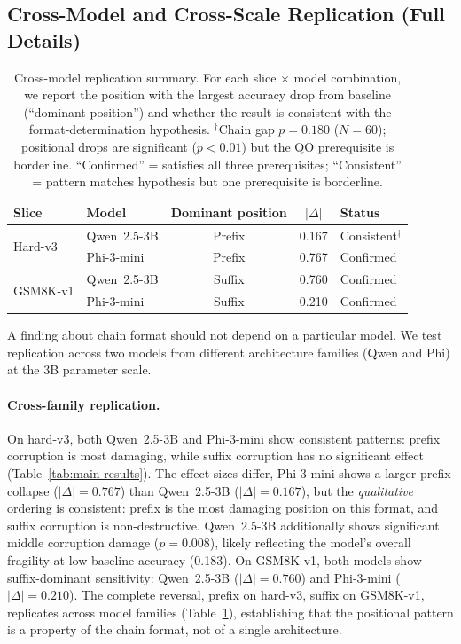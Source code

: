 \documentclass{article}
\theoremstyle{definition}
\theoremstyle{definition}
\begin{document}
\subsection{Cross-Model and Cross-Scale Replication (Full Details)}
\label{sec:crossmodel}

\begin{table}[t]
  \centering
  \small
  \caption{Cross-model replication summary. For each slice $\times$ model
  combination, we report the position with the largest accuracy drop
  from baseline (``dominant position'') and whether the result is
  consistent with the format-determination hypothesis.
  $^\dagger$Chain gap $p=0.180$ ($N=60$); positional drops are
  significant ($p{<}0.01$) but the QO prerequisite is borderline.
  ``Confirmed'' = satisfies all three prerequisites; ``Consistent'' = pattern
  matches hypothesis but one prerequisite is borderline.}
  \label{tab:crossmodel}
  \begin{tabular}{llccl}
    \toprule
    Slice & Model & Dominant position & $|\Delta|$ & Status \\
    \midrule
    \multirow{2}{*}{Hard-v3}
      & Qwen~2.5-3B  & Prefix & 0.167 & Consistent$^{\dagger}$ \\
      & Phi-3-mini    & Prefix & 0.767 & Confirmed \\
    \midrule
    \multirow{2}{*}{GSM8K-v1}
      & Qwen~2.5-3B  & Suffix & 0.760 & Confirmed \\
      & Phi-3-mini    & Suffix & 0.210 & Confirmed \\
    \bottomrule
  \end{tabular}
\end{table}

A finding about chain format should not depend on a particular model. We
test replication across two models from different architecture families
(Qwen and Phi) at the 3B parameter scale.

\paragraph{Cross-family replication.}
On hard-v3, both Qwen~2.5-3B and Phi-3-mini show consistent patterns:
prefix corruption is most damaging, while suffix corruption has no significant
effect (Table~\ref{tab:main-results}).
The effect sizes differ, Phi-3-mini shows a larger prefix collapse
($|\Delta| = 0.767$) than Qwen~2.5-3B ($|\Delta| = 0.167$), but the
\emph{qualitative} ordering is consistent: prefix is the most damaging
position on this format, and suffix corruption is non-destructive.
Qwen~2.5-3B additionally shows significant middle corruption damage
($p = 0.008$), likely reflecting the model's overall fragility at low
baseline accuracy (0.183). On GSM8K-v1, both models show suffix-dominant
sensitivity: Qwen~2.5-3B ($|\Delta| = 0.760$) and Phi-3-mini
($|\Delta| = 0.210$). The complete reversal, prefix on hard-v3,
suffix on GSM8K-v1, replicates across model families
(Table~\ref{tab:crossmodel}), establishing that the positional pattern
is a property of the chain format, not of a single architecture.
\end{document}
